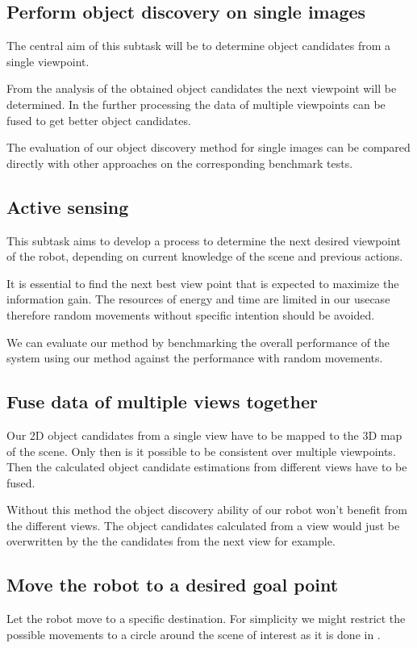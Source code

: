 \documentclass[a4paper,11pt,english]{article}
\begin{document}
\subsection{Perform object discovery on single images}
The central aim of this subtask will be to determine object candidates from a single viewpoint.

From the analysis of the obtained object candidates the next viewpoint will be determined.
In the further processing the data of multiple viewpoints can be fused to get better object candidates.

The evaluation of our object discovery method for single images can be compared directly with other approaches on the corresponding benchmark tests.

\subsection{Active sensing}
This subtask aims to develop a process to determine the next desired viewpoint of the robot, depending on current knowledge of the scene and previous actions.

It is essential to find the next best view point that is expected to maximize the information gain.
The resources of energy and time are limited in our usecase therefore random movements without specific intention should be avoided.

We can evaluate our method by benchmarking the overall performance of the system using our method against the performance with random movements.

\subsection{Fuse data of multiple views together}
Our 2D object candidates from a single view have to be mapped to the 3D map of the scene.
Only then is it possible to be consistent over multiple viewpoints.
Then the calculated object candidate estimations from different views have to be fused.

Without this method the object discovery ability of our robot won't benefit from the different views.
The object candidates calculated from a view would just be overwritten by the the candidates from the next view for example.

\subsection{Move the robot to a desired goal point}
Let the robot move to a specific destination.
For simplicity we might restrict the possible movements to a circle around the scene of interest as it is done in \cite{atanasov2014nonmyopic}.
\end{document}
